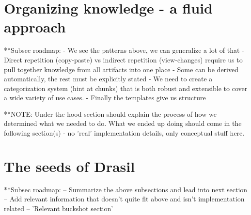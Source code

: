 \section{Organizing knowledge - a fluid approach}
  **Subsec roadmap:
    - We see the patterns above, we can generalize a lot of that
    - Direct repetition (copy-paste) vs indirect repetition (view-changes)
    require us to pull together knowledge from all artifacts into one place
    - Some can be derived automatically, the rest must be explicitly stated
    - We need to create a categorization system (hint at chunks) that is both
    robust and extensible to cover a wide variety of use cases.
    - Finally the templates give us structure

  **NOTE: Under the hood section should explain the process of how we determined
  what we needed to do. What we ended up doing should come in the following
  section(s) - no 'real' implementation details, only conceptual stuff here.
  
\section{The seeds of Drasil}
  **Subsec roadmap:
    -- Summarize the above subsections and lead into next section
    -- Add relevant information that doesn't quite fit above 
      and isn't implementation related
    -- 'Relevant buckshot section'